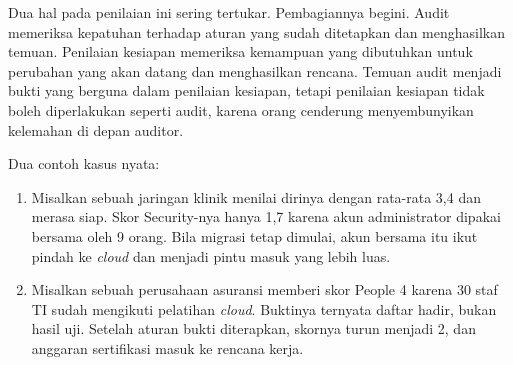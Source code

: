 Dua hal pada penilaian ini sering tertukar. Pembagiannya begini. Audit memeriksa
kepatuhan terhadap aturan yang sudah ditetapkan dan menghasilkan temuan. Penilaian
kesiapan memeriksa kemampuan yang dibutuhkan untuk perubahan yang akan datang dan
menghasilkan rencana. Temuan audit menjadi bukti yang berguna dalam penilaian kesiapan,
tetapi penilaian kesiapan tidak boleh diperlakukan seperti audit, karena orang cenderung
menyembunyikan kelemahan di depan auditor.

Dua contoh kasus nyata:
\begin{enumerate}
  \item Misalkan sebuah jaringan klinik menilai dirinya dengan rata-rata 3,4 dan merasa
        siap. Skor Security-nya hanya 1,7 karena akun administrator dipakai bersama oleh 9
        orang. Bila migrasi tetap dimulai, akun bersama itu ikut pindah ke \textit{cloud}
        dan menjadi pintu masuk yang lebih luas.
  \item Misalkan sebuah perusahaan asuransi memberi skor People 4 karena 30 staf TI sudah
        mengikuti pelatihan \textit{cloud}. Buktinya ternyata daftar hadir, bukan hasil
        uji. Setelah aturan bukti diterapkan, skornya turun menjadi 2, dan anggaran
        sertifikasi masuk ke rencana kerja.
\end{enumerate}

